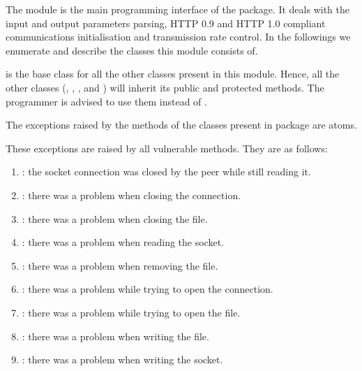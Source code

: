 \documentclass{ozdoc}
\begin{document}
\label{CHAPTER.HTTPCLIENT}



The  module is the main programming interface of the  package. It deals with the input and output parameters parsing, HTTP 0.9 and HTTP 1.0 compliant communications initialisation and transmission rate control. In the followings we enumerate and describe the classes this module consists of.

 is the base class for all the other classes present in this module. Hence, all the other classes (, , ,  and ) will inherit its public and protected methods. The programmer is advised to use them instead of .

\label{SECTION.EXCEPTIONS}



The exceptions raised by the methods of the classes present in  package are atoms.

\label{SUBSECTION.GENEXCEPTIONS}



  \mozartEMPTY
These exceptions are raised by all vulnerable methods. They are as follows: \mozartEMPTY
\begin{enumerate}
\item{} : the socket connection was closed by the peer while still reading it.
\item{} : there was a problem when closing the connection.
\item{} : there was a problem when closing the file.
\item{} : there was a problem when reading the socket.
\item{} : there was a problem when removing the file.
\item{} : there was a problem while trying to open the connection.
\item{} : there was a problem while trying to open the file.
\item{} : there was a problem when writing the file.
\item{} : there was a problem when writing the socket.
\end{enumerate}
\end{document}

